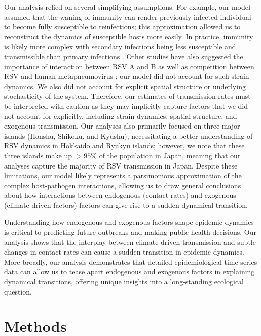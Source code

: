 \documentclass[12pt]{article}
\begin{document}
Our analysis relied on several simplifying assumptions.
For example, our model assumed that the waning of immunity can render previously infected individual to become fully susceptible to reinfections; this approximation allowed us to reconstruct the dynamics of susceptible hosts more easily.
In practice, immunity is likely more complex with secondary infections being less susceptible and transmissible than primary infections \citep{pitzer2015environmental}.
Other studies have also suggested the importance of interaction between RSV A and B \citep{white2005transmission,holmdahl2024differential} as well as competition between RSV and human metapneumovirus \citep{bhattacharyya2015cross}; 
our model did not account for such strain dynamics.
We also did not account for explicit spatial structure or underlying stochasticity of the system.
Therefore, our estimates of transmission rates must be interpreted with caution as they may implicitly capture factors that we did not account for explicitly, including strain dynamics, spatial structure, and exogenous transmission.
Our analyses also primarily focused on three major islands (Honshu, Shikoku, and Kyushu), necessitating a better understanding of RSV dynamics in Hokkaido and Ryukyu islands;
however, we note that these three islands make up $>95\%$ of the population in Japan, meaning that our analyses capture the majority of RSV transmission in Japan.
Despite these limitations, our model likely represents a parsimonious approximation of the complex host-pathogen interactions, allowing us to draw general conclusions about how interactions between endogenous (contact rates) and exogenous (climate-driven factors) factors can give rise to a sudden dynamical transition.

Understanding how endogenous and exogenous factors shape epidemic dynamics is critical to predicting future outbreaks and making public health decisions.
Our analysis shows that the interplay between climate-driven transmission and subtle changes in contact rates can cause a sudden transition in epidemic dynamics.
More broadly, our analysis demonstrates that detailed epidemiological time series data can allow us to tease apart endogenous and exogenous factors in explaining dynamical transitions, offering unique insights into a long-standing ecological question.

\section*{Methods}
\end{document}
